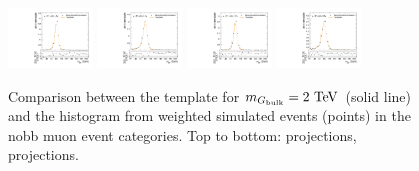 \begin{figure}[htpb]
  \includegraphics[width=0.2\textwidth]{fig/2Dfit/templateVsReco_GbuToWW2000_r0_MJ_mu_HP_nobb_LDy.pdf}
  \includegraphics[width=0.2\textwidth]{fig/2Dfit/templateVsReco_GbuToWW2000_r0_MJ_mu_LP_nobb_LDy.pdf}
  \includegraphics[width=0.2\textwidth]{fig/2Dfit/templateVsReco_GbuToWW2000_r0_MJ_mu_HP_nobb_HDy.pdf}
  \includegraphics[width=0.2\textwidth]{fig/2Dfit/templateVsReco_GbuToWW2000_r0_MJ_mu_LP_nobb_HDy.pdf}\\
  \caption{
    Comparison between the \ggF\GBulktoWW template for $m_{\GBulk}=2\unit{TeV}$ (solid line) and the histogram from weighted simulated events (points) in the nobb muon event categories.
    Top to bottom: \MVV projections, \MJ projections.
  }
  \label{fig:1dtemplateVsReco_GbuToWW2000_Run2}
\end{figure}

